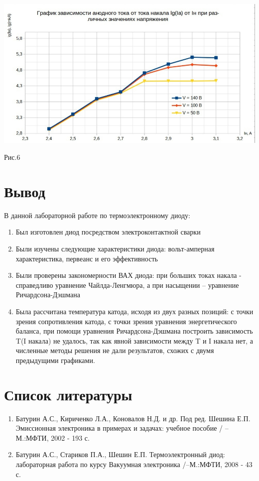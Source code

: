 \documentclass[11pt]{article}
\begin{document}
\includegraphics[width=18cm]{g5}\\
\begin{center}
Рис.6
\end{center}
\newpage

\section{Вывод}

В данной лабораторной работе по термоэлектронному диоду:
\begin{enumerate}
    \item Был изготовлен диод посредством электроконтактной сварки
    \item Были изучены следующие характеристики диода: вольт-амперная характеристика, первеанс и его эффективность
    \item Были проверены закономерности ВАХ диода: при больших токах накала - справедливо уравнение Чайлда-Ленгмюра, а при насыщении – уравнение Ричардсона-Дэшмана
    \item Была рассчитана температура катода, исходя из двух разных позиций: с точки зрения сопротивления катода, с точки зрения уравнения энергетического баланса, при помощи уравнения Ричардсона-Дэшмана построить зависимость T(I накала) не удалось, так как явной зависимости между T и I накала нет, а
численные методы решения не дали результатов, схожих с двумя предыдущими графиками.\\
\end{enumerate}
\newpage
\section{Список литературы}
\begin{enumerate}
    \item Батурин А.С., Кириченко Л.А., Коновалов Н.Д. и др. Под ред. Шешина Е.П. Эмиссионная электроника в примерах и задачах: учебное пособие / --М.:МФТИ, 2002 - 193 с. 
    \item Батурин А.С., Стариков П.А., Шешин Е.П. Термоэлектронный диод: лабораторная работа по курсу Вакуумная электроника /--М.:МФТИ, 2008 - 43 с.
\end{enumerate}
\end{document}
